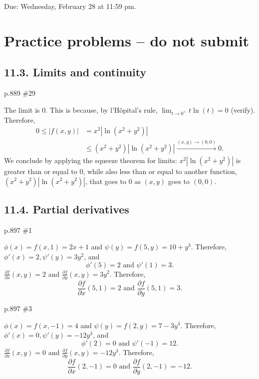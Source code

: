 \maketitle

Due: Wednesday, February 28 at 11:59 pm.

\section{Practice problems -- do not submit}

\subsection*{11.3. Limits and continuity}
\begin{practice}p.889 \#29\end{practice}
\begin{pracsol}
  The limit is 0. This is because, by l'Hôpital's rule, $\lim_{t\to 0^+}t\ln(t)=0$ (verify). Therefore,
  \[\begin{split}
    0\leq |f(x,y)| &= x^2|\ln(x^2+y^2)|\\
    &\leq (x^2+y^2)|\ln(x^2+y^2)|\xrightarrow{(x,y)\to(0,0)}0.
  \end{split}\]
  We conclude by applying the squeeze theorem for limits: $x^2|\ln(x^2+y^2)|$ is greater than or equal to 0, while also less than or equal to another function, $(x^2+y^2)|\ln(x^2+y^2)|$, that goes to 0 as $(x,y)$ goes to $(0,0)$.
\end{pracsol}

\subsection*{11.4. Partial derivatives}
\begin{practice}p.897 \#1\end{practice}
\begin{pracsol}
  $\phi(x)=f(x,1)=2x+1$ and $\psi(y)=f(5,y)=10+y^3$. Therefore, $\phi'(x)=2,\psi'(y)=3y^2$, and
  \[\phi'(5)=2\text{ and }\psi'(1)=3.\]
  $\frac{\partial f}{\partial x}(x,y)=2$ and $\frac{\partial f}{\partial y}(x,y)=3y^2$. Therefore,
  \[\frac{\partial f}{\partial x}(5,1)=2\text{ and }\frac{\partial f}{\partial y}(5,1)=3.\]
\end{pracsol}

\begin{practice}p.897 \#3\end{practice}
\begin{pracsol}
  $\phi(x)=f(x,-1)=4$ and $\psi(y)=f(2,y)=7-3y^4$. Therefore, $\phi'(x)=0,\psi'(y)=-12y^3$, and
  \[\phi'(2)=0\text{ and }\psi'(-1)=12.\]
  $\frac{\partial f}{\partial x}(x,y)=0$ and $\frac{\partial f}{\partial y}(x,y)=-12y^3$. Therefore,
  \[\frac{\partial f}{\partial x}(2,-1)=0\text{ and }\frac{\partial f}{\partial y}(2,-1)=-12.\]
\end{pracsol}

